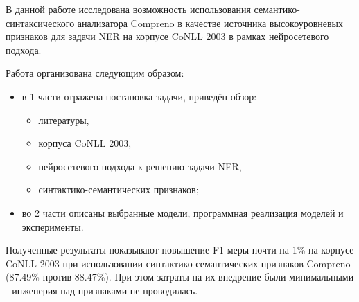   В данной работе исследована возможность использования семантико-синтаксического
  анализатора Compreno в качестве источника высокоуровневых признаков для задачи
  NER на корпусе CoNLL 2003 в рамках нейросетевого подхода.

  Работа организована следующим образом:
  \begin{itemize}
    \item в 1 части отражена постановка задачи, приведён обзор:
    \begin{itemize}
      \item литературы,
      \item корпуса CoNLL 2003,
      \item нейросетевого подхода к решению задачи NER,
      \item синтактико-семантических признаков;
    \end{itemize}
    \item во 2 части описаны выбранные модели, программная реализация моделей и эксперименты.
  \end{itemize}

  Полученные результаты показывают повышение F1-меры почти на 1\% на корпусе CoNLL 2003
  при использовании синтактико-семантических признаков Compreno (87.49\% против 88.47\%).
  При этом затраты на их внедрение были минимальными - инженерия над признаками не проводилась.
